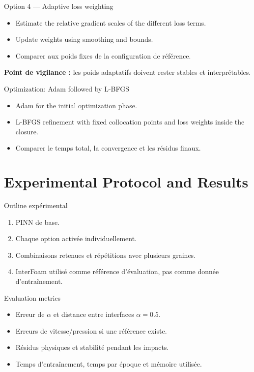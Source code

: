 \documentclass[aspectratio=169,11pt]{beamer}
\begin{document}
\begin{frame}{Option 4 — Adaptive loss weighting}
\begin{itemize}
  \item Estimate the relative gradient scales of the different loss terms.
  \item Update weights using smoothing and bounds.
  \item Comparer aux poids fixes de la configuration de référence.
\end{itemize}
\textbf{Point de vigilance :} les poids adaptatifs doivent rester stables et interprétables.
\end{frame}

\begin{frame}{Optimization: Adam followed by L-BFGS}
\begin{itemize}
  \item Adam for the initial optimization phase.
  \item L-BFGS refinement with fixed collocation points and loss weights inside the closure.
  \item Comparer le temps total, la convergence et les résidus finaux.
\end{itemize}
\end{frame}

\section{Experimental Protocol and Results}
\begin{frame}{Outline expérimental}
\begin{enumerate}
  \item PINN de base.
  \item Chaque option activée individuellement.
  \item Combinaisons retenues et répétitions avec plusieurs graines.
  \item InterFoam utilisé comme référence d'évaluation, pas comme donnée d'entraînement.
\end{enumerate}
\end{frame}

\begin{frame}{Evaluation metrics}
\begin{itemize}
  \item Erreur de $\alpha$ et distance entre interfaces $\alpha=0.5$.
  \item Erreurs de vitesse/pression si une référence existe.
  \item Résidus physiques et stabilité pendant les impacts.
  \item Temps d'entraînement, temps par époque et mémoire utilisée.
\end{itemize}
\end{frame}
\end{document}
